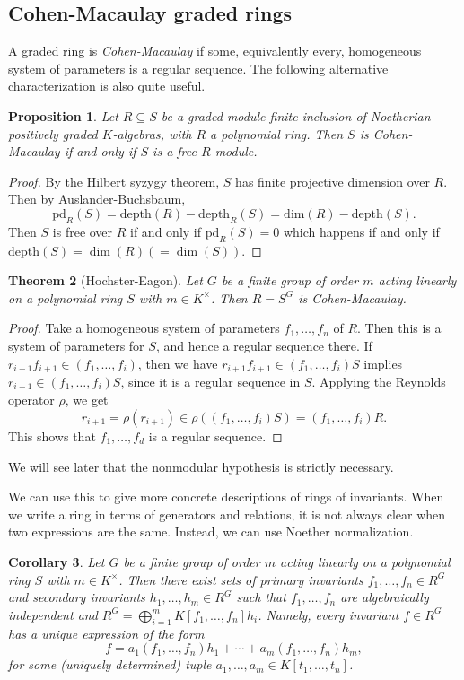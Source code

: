 \documentclass[12pt]{amsart}
\newtheorem{theorem}{Theorem}[section]
\newtheorem{corollary}[theorem]{Corollary}
\newtheorem{proposition}[theorem]{Proposition}
\theoremstyle{definition}
\numberwithin{equation}{theorem}
\begin{document}
\subsection*{Cohen-Macaulay graded rings} A graded ring is \emph{Cohen-Macaulay} if some, equivalently every, homogeneous system of parameters is a regular sequence. The following alternative characterization is also quite useful.


\begin{proposition} Let $R\subseteq S$ be a graded module-finite inclusion of Noetherian positively graded $K$-algebras, with $R$ a polynomial ring.
Then $S$ is Cohen-Macaulay if and only if $S$ is a free $R$-module.
\end{proposition}
\begin{proof}
By the Hilbert syzygy theorem, $S$ has finite projective dimension over $R$. Then by Auslander-Buchsbaum,
\[ \mathrm{pd}_R(S) = \mathrm{depth}(R) - \mathrm{depth}_R(S) =\mathrm{dim}(R) - \mathrm{depth}(S).\]
Then $S$ is free over $R$ if and only if $\mathrm{pd}_R(S) = 0$ which happens if and only if $\mathrm{depth}(S) = \dim(R) (=\dim(S))$.
\end{proof}

\begin{theorem}[Hochster-Eagon] Let $G$ be a finite group of order $m$ acting linearly on a polynomial ring $S$ with $m\in K^\times$. Then $R=S^G$ is Cohen-Macaulay.
\end{theorem}
\begin{proof}
Take a homogeneous system of parameters $f_1,\dots,f_n$ of $R$. Then this is a system of parameters for $S$, and hence a regular sequence there. If $r_{i+1} f_{i+1} \in (f_1,\dots,f_i)$, then we have $r_{i+1} f_{i+1} \in (f_1,\dots,f_i)S$ implies $r_{i+1}\in (f_1,\dots,f_i)S$, since it is a regular sequence in $S$. Applying the Reynolds operator $\rho$, we get 
\[ r_{i+1} = \rho(r_{i+1}) \in \rho((f_1,\dots,f_i)S) = (f_1,\dots, f_i)R.\]
This shows that $f_1,\dots,f_d$ is a regular sequence.
\end{proof}

We will see later that the nonmodular hypothesis is strictly necessary.

 We can use this to give more concrete descriptions of rings of invariants. When we write a ring in terms of generators and relations, it is not always clear when two expressions are the same. Instead, we can use Noether normalization.
 
 \begin{corollary}  Let $G$ be a finite group of order $m$ acting linearly on a polynomial ring $S$ with $m\in K^\times$. Then there exist sets of \emph{primary invariants} $f_1,\dots,f_n\in R^G$ and \emph{secondary invariants} $h_1,\dots,h_m\in R^G$ such that $f_1,\dots, f_n$ are algebraically independent and $R^G= \bigoplus_{i=1}^m K[f_1,\dots, f_n] h_i$. Namely, every invariant $f\in R^G$ has a unique expression of the form
 \[ f = a_1(f_1,\dots,f_n) h_1 + \cdots + a_m(f_1,\dots, f_n) h_m,\]
 for some (uniquely determined) tuple $a_1,\dots,a_m \in K[t_1,\dots,t_n]$.
 \end{corollary}
 
\end{document}
